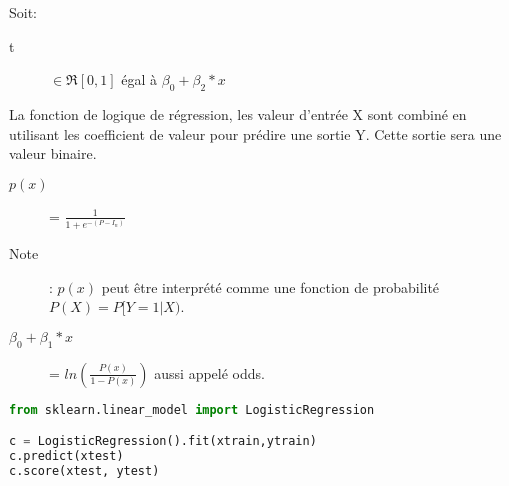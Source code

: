Soit:
\begin{description}
\item[t] $\in \Re[0,1]$ égal à $\beta_0 + \beta_2 * x$
\end{description}

La fonction de logique de régression, les valeur d'entrée X sont combiné en utilisant les coefficient de valeur pour prédire une sortie Y. Cette sortie sera une valeur binaire.

\begin{description}
\item[$p(x)$] = $ \frac{1}{1 + e^{-(P-I_n)}}$
\item[Note]: $p(x)$ peut être interprété comme une fonction de probabilité $P(X) = P[Y=1 | X)$.
\item[$\beta_0 + \beta_1 * x$] = $ ln(\frac{P(x)}{1 - P(x)})$ aussi appelé odds.
\end{description}

\lstset{style=mlpythoncode}
\begin{lstlisting}[language=Python]
from sklearn.linear_model import LogisticRegression

c = LogisticRegression().fit(xtrain,ytrain)
c.predict(xtest)
c.score(xtest, ytest)
\end{lstlisting}


